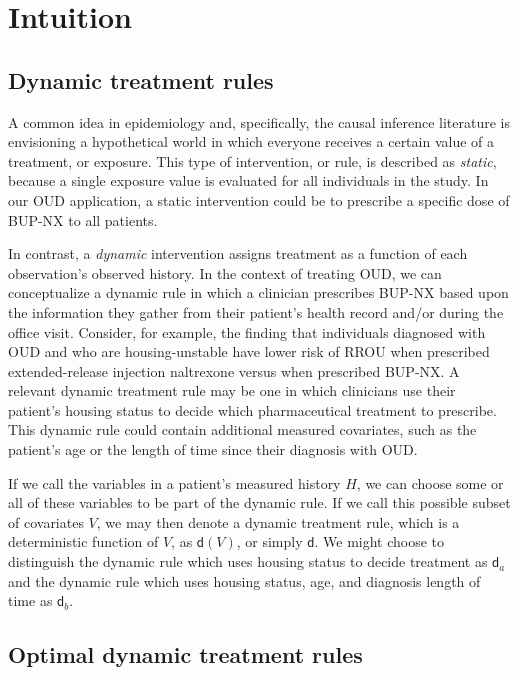 \documentclass[11pt]{article}
\renewcommand{\d}{\mathsf{d}}
\begin{document}
\section{Intuition}

	\subsection{Dynamic treatment rules}

	A common idea in epidemiology and, specifically, the causal inference literature is envisioning a hypothetical world in which everyone receives a certain value of a treatment, or exposure. This type of intervention, or rule, is described as \emph{static}, because a single exposure value is evaluated for all individuals in the study. In our OUD application, a static intervention could be to prescribe a specific dose of BUP-NX to all patients.
		
	In contrast, a \emph{dynamic} intervention assigns treatment as a function of each observation's observed history. In the context of treating OUD, we can conceptualize a dynamic rule in which a clinician prescribes BUP-NX based upon the information they gather from their patient's health record and/or during the office visit. Consider, for example, the finding that individuals diagnosed with OUD and who are housing-unstable have lower risk of RROU when prescribed extended-release injection naltrexone versus when prescribed BUP-NX. A relevant dynamic treatment rule may be one in which clinicians use their patient's housing status to decide which pharmaceutical treatment to prescribe. This dynamic rule could contain additional measured covariates, such as the patient's age or the length of time since their diagnosis with OUD.
	
	If we call the variables in a patient's measured history $H$, we can choose some or all of these variables to be part of the dynamic rule. If we call this possible subset of covariates $V$, we may then denote a dynamic treatment rule, which is a deterministic function of $V$, as $\d(V)$, or simply $\d$. We might choose to distinguish the dynamic rule which uses housing status to decide treatment as $\d_{a}$ and the dynamic rule which uses housing status, age, and diagnosis length of time as $\d_{b}$.
		
	\subsection{Optimal dynamic treatment rules} 
	
\end{document}
